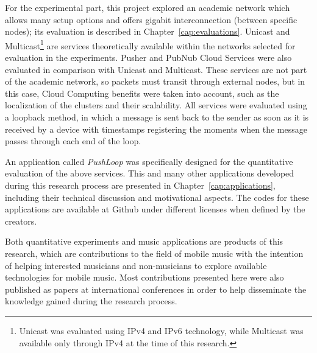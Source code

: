 For the experimental part, this project explored an academic network which allows many setup options and offers gigabit interconnection (between specific nodes); its evaluation is described in Chapter~\ref{cap:evaluations}.
Unicast and Multicast\footnote{Unicast was evaluated using IPv4 and IPv6 technology, while Multicast was available only through IPv4 at the time of this research.} are services theoretically available within the networks selected for evaluation in the experiments.
Pusher and PubNub Cloud Services were also evaluated in comparison with Unicast and Multicast.
These services are not part of the academic network, so packets must transit through external nodes, but in this case, Cloud Computing benefits were taken into account, such as the localization of the clusters and their scalability.
All services were evaluated using a loopback method, in which a message is sent back to the sender as soon as it is received by a device with timestamps registering the moments when the message passes through each end of the loop.

An application called \textit{PushLoop} was specifically designed for the quantitative evaluation of the above services.
This and many other applications developed during this research process are presented in Chapter~\ref{cap:applications}, including their technical discussion and motivational aspects.
The codes for these applications are available at Github under different licenses when defined by the creators.

Both quantitative experiments and music applications are products of this research, which are contributions to the field of mobile music with the intention of helping interested musicians and non-musicians to explore available technologies for mobile music.
Most contributions presented here were also published as papers at international conferences in order to help disseminate the knowledge gained during the research process.





